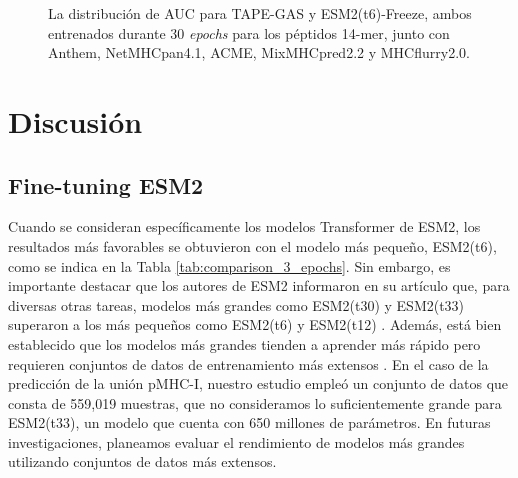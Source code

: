 \begin{figure}[h]
	\centering	
	
	\caption{
		La distribución de AUC para TAPE-GAS y ESM2(t6)-Freeze, ambos entrenados durante 30 \textit{epochs} para los péptidos 14-mer, junto con Anthem, NetMHCpan4.1, ACME, MixMHCpred2.2 y MHCflurry2.0.}
	\label{fig:auc_distribution14}
\end{figure}


\section{Discusión}

\subsection{Fine-tuning ESM2}

Cuando se consideran específicamente los modelos Transformer de ESM2, los resultados más favorables se obtuvieron con el modelo más pequeño, ESM2(t6), como se indica en la Tabla \ref{tab:comparison_3_epochs}. Sin embargo, es importante destacar que los autores de ESM2 informaron en su artículo que, para diversas otras tareas, modelos más grandes como ESM2(t30) y ESM2(t33) superaron a los más pequeños como ESM2(t6) y ESM2(t12) \citep{lin2023evolutionary}. Además, está bien establecido que los modelos más grandes tienden a aprender más rápido pero requieren conjuntos de datos de entrenamiento más extensos \citep{elnaggar2021prottrans}. En el caso de la predicción de la unión pMHC-I, nuestro estudio empleó un conjunto de datos que consta de 559,019 muestras, que no consideramos lo suficientemente grande para ESM2(t33), un modelo que cuenta con 650 millones de parámetros. En futuras investigaciones, planeamos evaluar el rendimiento de modelos más grandes utilizando conjuntos de datos más extensos.

